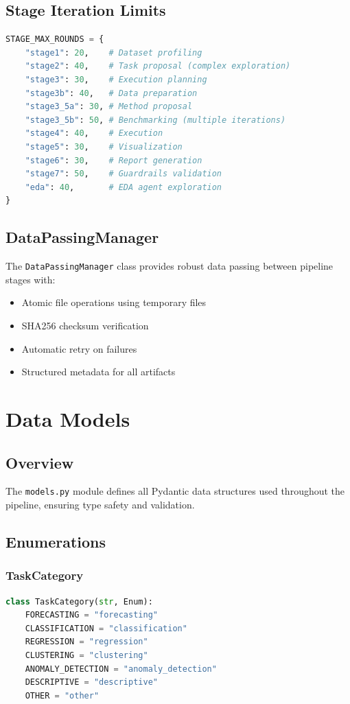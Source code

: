 \documentclass[12pt,a4paper]{report}
\begin{document}
\section{Stage Iteration Limits}
\begin{lstlisting}[language=Python]
STAGE_MAX_ROUNDS = {
    "stage1": 20,    # Dataset profiling
    "stage2": 40,    # Task proposal (complex exploration)
    "stage3": 30,    # Execution planning
    "stage3b": 40,   # Data preparation
    "stage3_5a": 30, # Method proposal
    "stage3_5b": 50, # Benchmarking (multiple iterations)
    "stage4": 40,    # Execution
    "stage5": 30,    # Visualization
    "stage6": 30,    # Report generation
    "stage7": 50,    # Guardrails validation
    "eda": 40,       # EDA agent exploration
}
\end{lstlisting}

\section{DataPassingManager}
The \texttt{DataPassingManager} class provides robust data passing between pipeline stages with:
\begin{itemize}
    \item Atomic file operations using temporary files
    \item SHA256 checksum verification
    \item Automatic retry on failures
    \item Structured metadata for all artifacts
\end{itemize}

\chapter{Data Models}

\section{Overview}
The \texttt{models.py} module defines all Pydantic data structures used throughout the pipeline, ensuring type safety and validation.

\section{Enumerations}
\subsection{TaskCategory}
\begin{lstlisting}[language=Python]
class TaskCategory(str, Enum):
    FORECASTING = "forecasting"
    CLASSIFICATION = "classification"
    REGRESSION = "regression"
    CLUSTERING = "clustering"
    ANOMALY_DETECTION = "anomaly_detection"
    DESCRIPTIVE = "descriptive"
    OTHER = "other"
\end{lstlisting}
\end{document}
